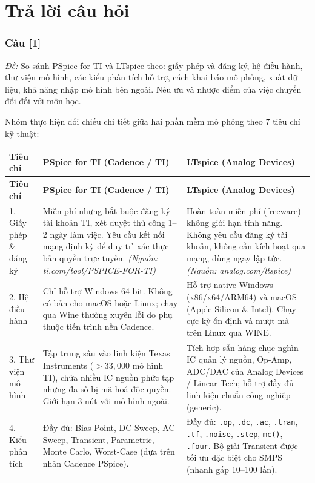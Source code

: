 \documentclass[12pt,a4paper]{article}
\newcommand{\hc}[1]{\cellcolor{navy}\color{white}\sffamily\bfseries\small #1}
\newcommand{\cauhoi}[2]{%
  \subsubsection{Câu [#1]}
  \begin{tcolorbox}[colback=white,colframe=guidegray!70,boxrule=0.4pt,arc=1pt,left=5pt,right=5pt,top=2pt,bottom=2pt]
  \small\textit{Đề:} #2
  \end{tcolorbox}
  \par\vspace{4pt}}
\begin{document}
\section{Trả lời câu hỏi}

\cauhoi{1}{So sánh PSpice for TI và LTspice theo: giấy phép và đăng ký, hệ điều hành, thư viện mô hình, các kiểu phân tích hỗ trợ, cách khai báo mô phỏng, xuất dữ liệu, khả năng nhập mô hình bên ngoài. Nêu ưu và nhược điểm của việc chuyển đổi đối với môn học.}

Nhóm thực hiện đối chiếu chi tiết giữa hai phần mềm mô phỏng theo 7 tiêu chí kỹ thuật:

{\small
\renewcommand{\arraystretch}{1.25}
\setlength{\tabcolsep}{3.5pt}
\begin{longtable}{|p{2.4cm}|p{6.3cm}|p{6.3cm}|}
\hline
\hc{Tiêu chí} & \hc{PSpice for TI (Cadence / TI)} & \hc{LTspice (Analog Devices)}\\ \hline
\endfirsthead
\hline
\hc{Tiêu chí} & \hc{PSpice for TI (Cadence / TI)} & \hc{LTspice (Analog Devices)}\\ \hline
\endhead
1. Giấy phép \& đăng ký & Miễn phí nhưng bắt buộc đăng ký tài khoản TI, xét duyệt thủ công 1--2 ngày làm việc. Yêu cầu kết nối mạng định kỳ để duy trì xác thực bản quyền trực tuyến. \newline\textit{(Nguồn: ti.com/tool/PSPICE-FOR-TI)} & Hoàn toàn miễn phí (freeware) không giới hạn tính năng. Không yêu cầu đăng ký tài khoản, không cần kích hoạt qua mạng, dùng ngay lập tức. \newline\textit{(Nguồn: analog.com/ltspice)} \\ \hline
2. Hệ điều hành & Chỉ hỗ trợ Windows 64-bit. Không có bản cho macOS hoặc Linux; chạy qua Wine thường xuyên lỗi do phụ thuộc tiến trình nền Cadence. & Hỗ trợ native Windows (x86/x64/ARM64) và macOS (Apple Silicon \& Intel). Chạy cực kỳ ổn định và mượt mà trên Linux qua WINE. \\ \hline
3. Thư viện mô hình & Tập trung sâu vào linh kiện Texas Instruments ($>33{,}000$ mô hình TI), chứa nhiều IC nguồn phức tạp nhưng đa số bị mã hoá độc quyền. Giới hạn 3 nút với mô hình ngoài. & Tích hợp sẵn hàng chục nghìn IC quản lý nguồn, Op-Amp, ADC/DAC của Analog Devices / Linear Tech; hỗ trợ đầy đủ linh kiện chuẩn công nghiệp (generic). \\ \hline
4. Kiểu phân tích & Đầy đủ: Bias Point, DC Sweep, AC Sweep, Transient, Parametric, Monte Carlo, Worst-Case (dựa trên nhân Cadence PSpice). & Đầy đủ: \texttt{.op}, \texttt{.dc}, \texttt{.ac}, \texttt{.tran}, \texttt{.tf}, \texttt{.noise}, \texttt{.step}, \texttt{mc()}, \texttt{.four}. Bộ giải Transient được tối ưu đặc biệt cho SMPS (nhanh gấp 10--100 lần). \\ \hline

\end{longtable}}
\end{document}
